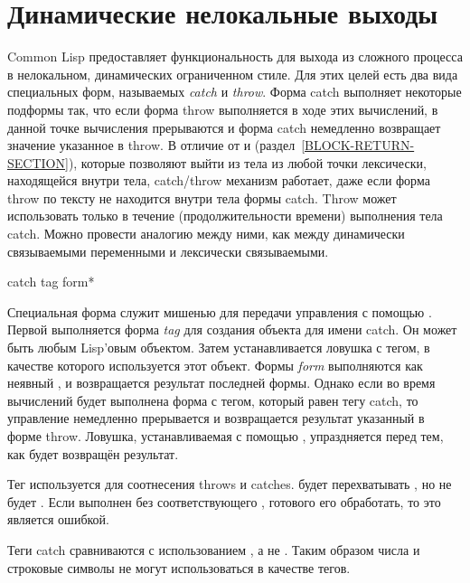 \section{Динамические нелокальные выходы}
\label{CATCH-THROW-SECTION}

Common Lisp предоставляет функциональность для выхода из сложного процесса в
нелокальном, динамических ограниченном стиле. Для этих целей есть два вида
специальных форм, называемых \emph{catch} и \emph{throw}.
Форма catch выполняет некоторые подформы так, что если форма throw выполняется в
ходе этих вычислений, в данной точке вычисления прерываются и форма catch
немедленно возвращает значение указанное в throw. В отличие от  и
 (раздел~\ref{BLOCK-RETURN-SECTION}), которые позволяют выйти из
тела  из любой точки лексически, находящейся внутри тела, catch/throw
механизм работает, даже если форма throw по тексту не находится внутри тела
формы catch.
Throw может использовать только в течение (продолжительности времени) выполнения
тела catch. Можно провести аналогию между ними, как между динамически
связываемыми переменными и лексически связываемыми.

\begin{defspec}
catch tag {form}*

Специальная форма  служит мишенью для передачи управления с помощью
.
Первой выполняется форма \emph{tag} для создания объекта для имени catch.
Он может быть любым Lisp'овым объектом.
Затем устанавливается ловушка с тегом, в качестве которого используется этот
объект.
Формы \emph{form} выполняются как неявный ,
и возвращается результат последней формы.
Однако если во время вычислений будет выполнена форма  с тегом,
который равен  тегу catch, то управление немедленно прерывается и
возвращается результат указанный в форме throw.
Ловушка, устанавливаемая с помощью , упраздняется перед тем, как
будет возвращён результат.

Тег используется для соотнесения throws и catches.
 будет перехватывать ,
но не будет . Если  выполнен без
соответствующего , готового его обработать, то это является ошибкой.

Теги catch сравниваются с использованием , а не .
Таким образом числа и строковые символы не могут использоваться в качестве
тегов.
\end{defspec}

